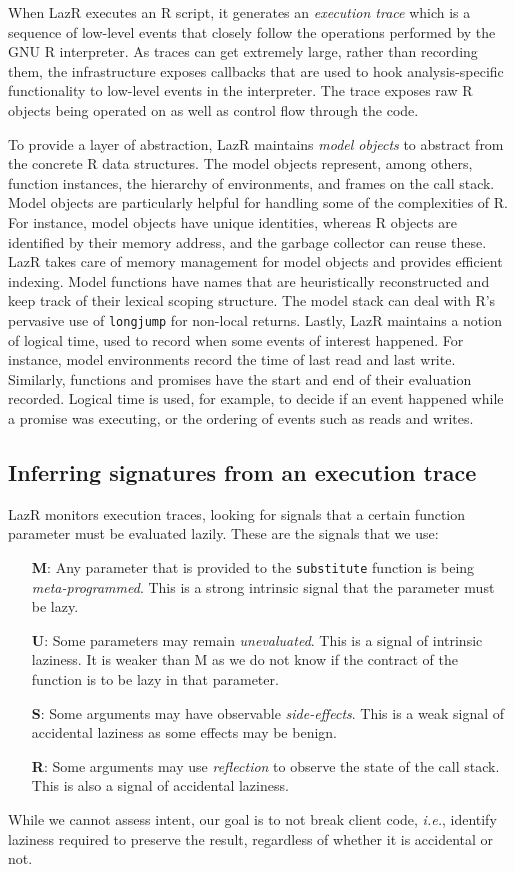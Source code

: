 \documentclass[review,creen,acmsmall]{acmart}
\renewcommand{\c}[1]{\lstinline |#1|\xspace}
\newcommand{\lazr}{{\sf LazR}\xspace}
\newcommand{\ie}{\emph{i.e.},\xspace}
\begin{document}
When \lazr executes an R script, it generates an \emph{execution trace} which is
a sequence of low-level events that closely follow the operations performed by
the GNU R interpreter. As traces can get extremely large, rather than recording
them, the infrastructure exposes callbacks that are used to hook
analysis-specific functionality to low-level events in the interpreter. The
trace exposes raw R objects being operated on as
well as control flow through the code.

To provide a layer of abstraction, \lazr maintains \emph{model objects} to
abstract from the concrete R data structures. The model objects represent,
among others, function instances, the hierarchy of environments, and frames
on the call stack. Model objects are particularly helpful for handling some of the
complexities of R. For instance, model objects have unique identities, whereas R
objects are identified by their memory address, and the garbage collector can
reuse these. \lazr takes care of memory management for model objects and
provides efficient indexing. Model functions have names that are heuristically
reconstructed and keep track of their lexical scoping structure. The model stack
can deal with R's pervasive use of \c{longjump} for non-local returns. Lastly,
\lazr maintains a notion of logical time, used to record when some
events of interest happened. For instance, model environments record the time of
last read and last write. Similarly, functions and promises have the start and
end of their evaluation recorded. Logical time is used, for example, to decide
if an event happened while a promise was executing, or the ordering of events
such as reads and writes.

\subsection{Inferring signatures from an execution trace}

\lazr monitors execution traces, looking for signals that a certain function
parameter must be evaluated lazily. These are the signals that we use:
\begin{itemize}
\item[{\bf M}:] Any parameter that is provided to the \c{substitute} function is
  being \emph{meta-programmed}. This is a strong intrinsic signal that the parameter
  must be lazy.
\item[{\bf U}:] Some parameters may remain \emph{unevaluated}. This is a signal
  of intrinsic laziness. It is weaker than M as we do not know if the contract
  of the function is to be lazy in that parameter.
\item [{\bf S}:] Some arguments may have observable \emph{side-effects}. This is
  a weak signal of accidental laziness as some effects may be benign.
\item[{\bf R}:] Some arguments may use \emph{reflection} to observe the state of
  the call stack. This is also a signal of accidental laziness.
\end{itemize}
\noindent
While we cannot assess intent, our goal is to not break client code, \ie
identify laziness required to preserve the result, regardless of whether it is
accidental or not.
\end{document}
